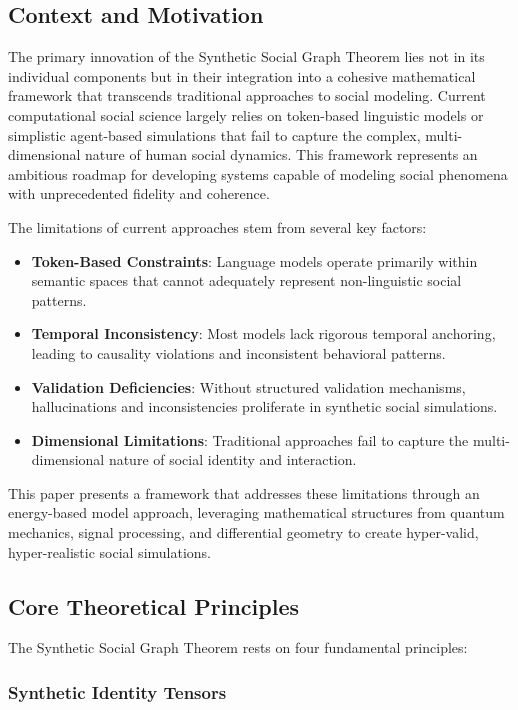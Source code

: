 \documentclass[11pt,a4paper]{article}
\begin{document}
\subsection{Context and Motivation}

The primary innovation of the Synthetic Social Graph Theorem lies not in its individual components but in their integration into a cohesive mathematical framework that transcends traditional approaches to social modeling. Current computational social science largely relies on token-based linguistic models or simplistic agent-based simulations that fail to capture the complex, multi-dimensional nature of human social dynamics. This framework represents an ambitious roadmap for developing systems capable of modeling social phenomena with unprecedented fidelity and coherence.

The limitations of current approaches stem from several key factors:

\begin{itemize}
\item \textbf{Token-Based Constraints}: Language models operate primarily within semantic spaces that cannot adequately represent non-linguistic social patterns.
\item \textbf{Temporal Inconsistency}: Most models lack rigorous temporal anchoring, leading to causality violations and inconsistent behavioral patterns.
\item \textbf{Validation Deficiencies}: Without structured validation mechanisms, hallucinations and inconsistencies proliferate in synthetic social simulations.
\item \textbf{Dimensional Limitations}: Traditional approaches fail to capture the multi-dimensional nature of social identity and interaction.
\end{itemize}

This paper presents a framework that addresses these limitations through an energy-based model approach, leveraging mathematical structures from quantum mechanics, signal processing, and differential geometry to create hyper-valid, hyper-realistic social simulations.

\subsection{Core Theoretical Principles}

The Synthetic Social Graph Theorem rests on four fundamental principles:

\subsubsection{Synthetic Identity Tensors}
\end{document}
